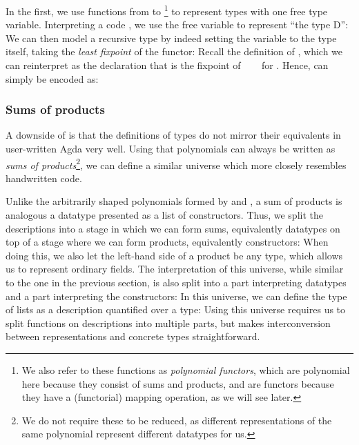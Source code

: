 In the first, we use functions from  to \footnote{We also refer to these functions as \emph{polynomial functors}, which are polynomial here because they consist of sums and products, and are functors because they have a (functorial) mapping operation, as we will see later.} to represent types with one free type variable. Interpreting a code , we use the free variable  to represent ``the type D'':
We can then model a recursive type by indeed setting the variable to the type itself, taking the \emph{least fixpoint} of the functor:
Recall the definition of \bN{}, which we can reinterpret as the declaration that  is the fixpoint of \ \ \  for . Hence, \bN{} can simply be encoded as:

\subsubsection{Sums of products}\label{ssec:background-sop}
A downside of  is that the definitions of types do not mirror their equivalents in user-written Agda very well. Using that polynomials can always be written as \emph{sums of products}\footnote{We do not require these to be reduced, as different representations of the same polynomial represent different datatypes for us.}, we can define a similar universe which more closely resembles handwritten code.

Unlike the arbitrarily shaped polynomials formed by  and , a sum of products is analogous a datatype presented as a list of constructors. Thus, we split the descriptions into a stage in which we can form sums, equivalently datatypes
on top of a stage where we can form products, equivalently constructors:
When doing this, we also let the left-hand side of a product be any type, which allows us to represent ordinary fields. The interpretation of this universe, while similar to the one in the previous section, is also split into a part interpreting datatypes
and a part interpreting the constructors:
In this universe, we can define the type of lists as a description quantified over a type:
Using this universe requires us to split functions on descriptions into multiple parts, but makes interconversion between representations and concrete types straightforward.

